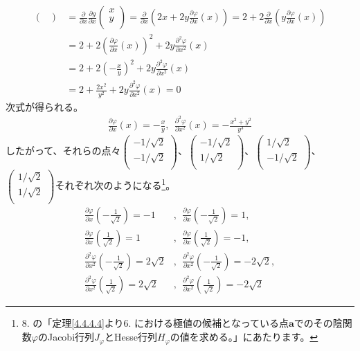 \documentclass[dvipdfmx]{jsarticle}
\begin{document}
\begin{align*}
\begin{pmatrix}
\end{pmatrix} &= \frac{\partial}{\partial x}\frac{\partial g}{\partial x}\begin{pmatrix}
x \\
y \\
\end{pmatrix} = \frac{\partial}{\partial x}\left( 2x + 2y\frac{\partial\varphi}{\partial x}(x) \right) = 2 + 2\frac{\partial}{\partial x}\left( y\frac{\partial\varphi}{\partial x}(x) \right)\\
&= 2 + 2\left( \frac{\partial\varphi}{\partial x}(x) \right)^{2} + 2y\frac{\partial^{2}\varphi}{\partial x^{2}}(x)\\
&= 2 + 2\left( - \frac{x}{y} \right)^{2} + 2y\frac{\partial^{2}\varphi}{\partial x^{2}}(x)\\
&= 2 + \frac{2x^{2}}{y^{2}} + 2y\frac{\partial^{2}\varphi}{\partial x^{2}}(x) = 0
\end{align*}
次式が得られる。
\begin{align*}
\frac{\partial\varphi}{\partial x}(x) = - \frac{x}{y},\ \ \frac{\partial^{2}\varphi}{\partial x^{2}}(x) = - \frac{x^{2} + y^{2}}{y^{3}}
\end{align*}
したがって、それらの点々$\begin{pmatrix}
 - {1}/{\sqrt{2}} \\
 - {1}/{\sqrt{2}} \\
\end{pmatrix}$、$\begin{pmatrix}
 - {1}/{\sqrt{2}} \\
{1}/{\sqrt{2}} \\
\end{pmatrix}$、$\begin{pmatrix}
{1}/{\sqrt{2}} \\
 - {1}/{\sqrt{2}} \\
\end{pmatrix}$、$\begin{pmatrix}
{1}/{\sqrt{2}} \\
{1}/{\sqrt{2}} \\
\end{pmatrix}$それぞれ次のようになる\footnote{8. の「定理\ref{4.4.4.4}より6. における極値の候補となっている点$\mathbf{a}$でのその陰関数$\varphi$のJacobi行列$J_{\varphi}$とHesse行列$H_{\varphi}$の値を求める。」にあたります。}。
\begin{align*}
\frac{\partial\varphi}{\partial x}\left( - \frac{1}{\sqrt{2}} \right) = - 1&,\ \ \frac{\partial\varphi}{\partial x}\left( - \frac{1}{\sqrt{2}} \right) = 1,\\
\frac{\partial\varphi}{\partial x}\left( \frac{1}{\sqrt{2}} \right) = 1&,\ \ \frac{\partial\varphi}{\partial x}\left( \frac{1}{\sqrt{2}} \right) = - 1,\\
\frac{\partial^{2}\varphi}{\partial x^{2}}\left( - \frac{1}{\sqrt{2}} \right) = 2\sqrt{2}&,\ \ \frac{\partial^{2}\varphi}{\partial x^{2}}\left( - \frac{1}{\sqrt{2}} \right) = - 2\sqrt{2},\\
\frac{\partial^{2}\varphi}{\partial x^{2}}\left( \frac{1}{\sqrt{2}} \right) = 2\sqrt{2}&,\ \ \frac{\partial^{2}\varphi}{\partial x^{2}}\left( \frac{1}{\sqrt{2}} \right) = - 2\sqrt{2}
\end{align*}
\end{document}
